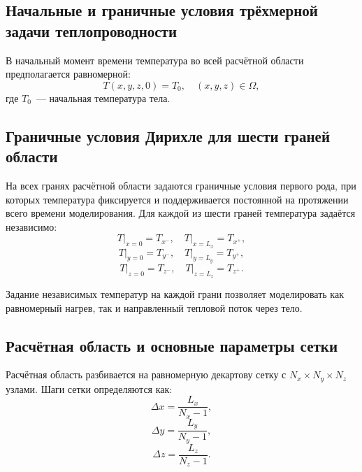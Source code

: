 \subsection{Начальные и граничные условия трёхмерной задачи теплопроводности}

В начальный момент времени температура во всей расчётной 
области предполагается равномерной:
\begin{equation}
    T(x, y, z, 0) = T_0, \quad (x, y, z) \in \Omega,
\end{equation}
где $T_0$~--- начальная температура тела.

\subsection{Граничные условия Дирихле для шести граней области}

На всех гранях расчётной области задаются граничные условия первого 
рода, при которых температура фиксируется и поддерживается постоянной 
на протяжении всего времени моделирования. Для каждой из шести граней 
температура задаётся независимо:
\begin{equation}
    T\big|_{x=0} = T_{x^-}, \quad T\big|_{x=L_x} = T_{x^+},
\end{equation}
\begin{equation}
    T\big|_{y=0} = T_{y^-}, \quad T\big|_{y=L_y} = T_{y^+},
\end{equation}
\begin{equation}
    T\big|_{z=0} = T_{z^-}, \quad T\big|_{z=L_z} = T_{z^+}.
\end{equation}

Задание независимых температур на каждой грани позволяет моделировать 
как равномерный нагрев, так и направленный тепловой поток через тело.

\subsection{Расчётная область и основные параметры сетки}

Расчётная область разбивается на равномерную декартову сетку 
с $N_x \times N_y \times N_z$ узлами. Шаги сетки определяются как:
\begin{equation}
    \Delta x = \frac{L_x}{N_x - 1},
\end{equation}
\begin{equation}
    \Delta y = \frac{L_y}{N_y - 1},
\end{equation}
\begin{equation}
    \Delta z = \frac{L_z}{N_z - 1}.
\end{equation}

